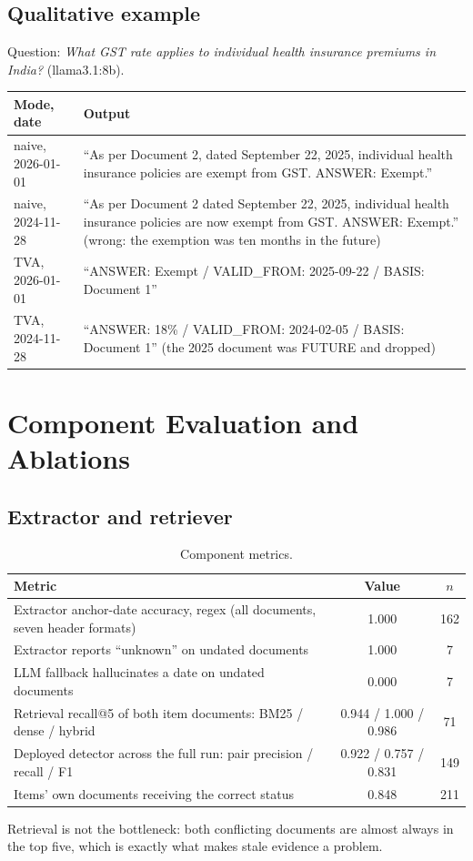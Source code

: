 \documentclass[11pt,a4paper]{report}
\begin{document}
\section{Qualitative example}
Question: \emph{What GST rate applies to individual health insurance premiums in India?} (llama3.1:8b).
\begin{table}[htbp]\centering\small
\begin{tabularx}{\linewidth}{l X}\toprule\rowcolor{cIngest}\textbf{Mode, date}&\textbf{Output}\\\midrule
naive, 2026-01-01 & ``As per Document 2, dated September 22, 2025, individual health insurance policies are exempt from GST. ANSWER: Exempt.''\\
naive, 2024-11-28 & ``As per Document 2 dated September 22, 2025, individual health insurance policies are now exempt from GST. ANSWER: Exempt.'' (wrong: the exemption was ten months in the future)\\
TVA, 2026-01-01 & ``ANSWER: Exempt / VALID\_FROM: 2025-09-22 / BASIS: Document 1''\\
TVA, 2024-11-28 & ``ANSWER: 18\% / VALID\_FROM: 2024-02-05 / BASIS: Document 1'' (the 2025 document was FUTURE and dropped)\\\bottomrule\end{tabularx}\end{table}

\chapter{Component Evaluation and Ablations}
\section{Extractor and retriever}
\begin{table}[htbp]\centering\caption{Component metrics.}\small
\begin{tabularx}{\linewidth}{X c c}\toprule\rowcolor{cIngest}\textbf{Metric}&\textbf{Value}&\textbf{$n$}\\\midrule
Extractor anchor-date accuracy, regex (all documents, seven header formats) & 1.000 & 162\\
Extractor reports ``unknown'' on undated documents & 1.000 & 7\\
LLM fallback hallucinates a date on undated documents & 0.000 & 7\\
Retrieval recall@5 of both item documents: BM25 / dense / hybrid & 0.944 / 1.000 / 0.986 & 71\\
Deployed detector across the full run: pair precision / recall / F1 & 0.922 / 0.757 / 0.831 & 149\\
Items' own documents receiving the correct status & 0.848 & 211\\\bottomrule\end{tabularx}\end{table}
Retrieval is not the bottleneck: both conflicting documents are almost always in the top five, which is exactly what makes stale evidence a problem.
\end{document}
